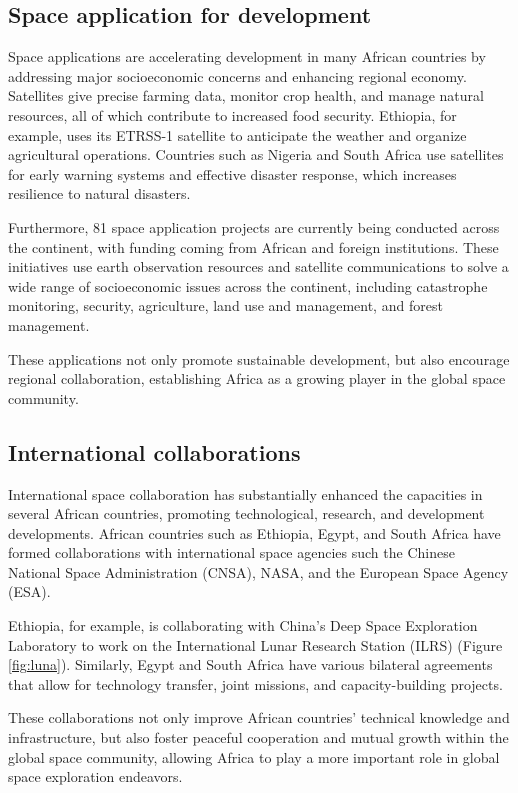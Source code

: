 \documentclass[final,5p,times, twocolumn, sort&compress, sc]{elsarticle}
\begin{document}
\subsection{\textbf{Space application for development}}
	Space applications are accelerating development in many African countries by addressing major socioeconomic concerns and enhancing regional economy. Satellites give precise farming data, monitor crop health, and manage natural resources, all of which contribute to increased food security. Ethiopia, for example, uses its ETRSS-1 satellite \cite{gadisa2023odyssey} to anticipate the weather and organize agricultural operations. Countries such as Nigeria and South Africa use satellites for early warning systems and effective disaster response, which increases resilience to natural disasters. 
	
	Furthermore, 81 space application projects \cite{sa2023} are currently being conducted across the continent, with funding coming from African and foreign institutions. These initiatives use earth observation resources and satellite communications to solve a wide range of socioeconomic issues across the continent, including catastrophe monitoring, security, agriculture, land use and management, and forest management.
		
	These applications not only promote sustainable development, but also encourage regional collaboration, establishing Africa as a growing player in the global space community.
\subsection{\textbf{International collaborations}}
	International space collaboration has substantially enhanced the capacities in several African countries, promoting technological, research, and development developments. African countries such as Ethiopia, Egypt, and South Africa have formed collaborations with international space agencies such the Chinese National Space Administration (CNSA), NASA, and the European Space Agency (ESA).
	
	Ethiopia, for example, is collaborating with China's Deep Space Exploration Laboratory to work on the International Lunar Research Station (ILRS) (Figure \ref{fig:luna}). Similarly, Egypt and South Africa have various bilateral agreements that allow for technology transfer, joint missions, and capacity-building projects. 
	
	These collaborations not only improve African countries' technical knowledge and infrastructure, but also foster peaceful cooperation and mutual growth within the global space community, allowing Africa to play a more important role in global space exploration endeavors.
\end{document}
